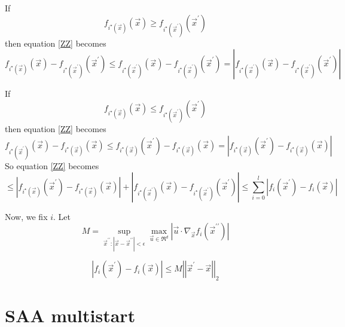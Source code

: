 \documentclass[phd,tocprelim]{cornell}
\begin{document}
If
\begin{equation}
    f_{i^{\star}(\vec{x})}(\vec{x}) \geq f_{i^{\star}(\vec{x}^{\prime})}(\vec{x}^{\prime})
\end{equation}
then equation \ref{ZZ} becomes
\begin{equation}
    f_{i^{\star}(\vec{x})}(\vec{x}) - f_{i^{\star}(\vec{x}^{\prime})}(\vec{x}^{\prime}) \leq f_{i^{\star}(\vec{x}^{\prime})}(\vec{x}) - f_{i^{\star}(\vec{x}^{\prime})}(\vec{x}^{\prime}) = \left|f_{i^{\star}(\vec{x}^{\prime})}(\vec{x}) - f_{i^{\star}(\vec{x}^{\prime})}(\vec{x}^{\prime})\right|
\end{equation}

If
\begin{equation}
    f_{i^{\star}(\vec{x})}(\vec{x}) \leq f_{i^{\star}(\vec{x}^{\prime})}(\vec{x}^{\prime})
\end{equation}
then equation \ref{ZZ} becomes
\begin{equation}
    f_{i^{\star}(\vec{x}^{\prime})}(\vec{x}) - f_{i^{\star}(\vec{x})}(\vec{x}) \leq f_{i^{\star}(\vec{x})}(\vec{x}^{\prime}) - f_{i^{\star}(\vec{x})}(\vec{x}) = \left|f_{i^{\star}(\vec{x})}(\vec{x}^{\prime}) - f_{i^{\star}(\vec{x})}(\vec{x})\right|
\end{equation}
So equation \ref{ZZ} becomes
\begin{equation}
    \leq \left|f_{i^{\star}(\vec{x})}(\vec{x}^{\prime}) - f_{i^{\star}(\vec{x})}(\vec{x})\right| + \left|f_{i^{\star}(\vec{x}^{\prime})}(\vec{x}) - f_{i^{\star}(\vec{x}^{\prime})}(\vec{x}^{\prime})\right| \leq \sum_{i=0}^{l} \left|f_{i}(\vec{x}^{\prime}) - f_{i}(\vec{x})\right|
\end{equation}

Now, we fix $i$. Let
\begin{equation}
    M = \sup_{\vec{x}^{\prime\prime}:|\vec{x} - \vec{x}^{\prime\prime}| < \epsilon} \max_{\vec{u} \in \Re^{d}} \left|\vec{u} \cdot \nabla_{\vec{x}} f_{i}(\vec{x}^{\prime\prime}) \right|
\end{equation}

\begin{equation}
    \left|f_{i}(\vec{x}^{\prime}) - f_{i}(\vec{x})\right| \leq M \left| \left| \vec{x}^{\prime} - \vec{x}\right|\right|_{2}
\end{equation}

\section{SAA multistart}
\end{document}
